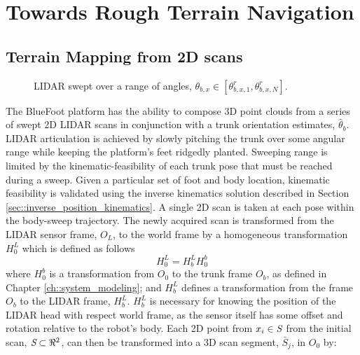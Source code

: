 	\section{Towards Rough Terrain Navigation}


		\subsection{Terrain Mapping from 2D scans}
			\label{ssec::terrain_mapping}
			\begin{figure}[!h]
				\centering
				\caption{LIDAR swept over a range of angles, $\theta_{b,x} \in [\theta_{b,x,1}^{r},\theta_{b,x,N}^{r}]$. }
				\label{fig::sensor_sweep}
			\end{figure}
			The BlueFoot platform has the ability to compose 3D point clouds from a series of swept 2D LIDAR scans in conjunction with a trunk orientation estimates, $\hat{\theta}_{b}$. LIDAR articulation is achieved by slowly pitching the trunk over some angular range while keeping the platform's feet ridgedly planted. Sweeping range is limited by the kinematic-feasibility of each trunk pose that must be reached during a sweep. Given a particular set of foot and body location, kinematic feasibility is validated using the inverse kinematics solution described in Section \ref{sec::inverse_position_kinematics}. A single 2D scan is taken at each pose within the body-sweep trajectory. The newly acquired scan is transformed from the LIDAR sensor frame, $O_{L}$, to the world frame by a homogeneous transformation $H^{L}_{0}$ which is defined as follows
				\begin{equation}
					H^{L}_{0} = H^{L}_{b} H^{b}_{0}
					\label{eq::world_to_sensor}
				\end{equation}
			where $H^{b}_{0}$ is a transformation from $O_{0}$ to the trunk frame $O_{b}$, as defined in Chapter \ref{ch::system_modeling}; and $H^{L}_{b}$ defines a transformation from the frame $O_{b}$ to the LIDAR frame, $H^{L}_{b}$. $H^{L}_{b}$ is necessary for knowing the position of the LIDAR head with respect world frame, as the sensor itself has some offset and rotation relative to the robot's body. Each 2D point from $x_{i} \in \emph{S}$ from the initial scan, $\emph{S}\subset \Re^{2}$, can then be transformed into a 3D scan segment, $\bar{S}_{j}$, in $O_{0}$ by:
